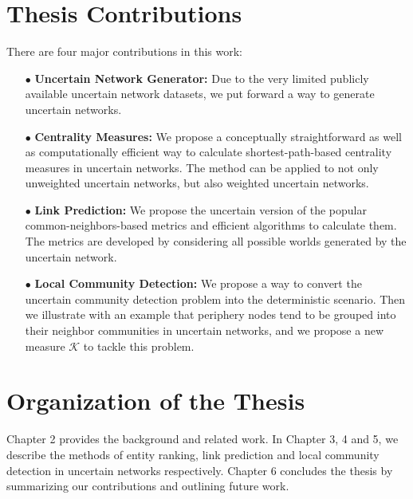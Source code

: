 \documentclass[\main/thesis.tex]{subfiles}
\begin{document}
\section{Thesis Contributions}
There are four major contributions in this work:
\begin{enumerate}
\item[$\bullet$] \textbf{Uncertain Network Generator:}  Due to the very limited publicly available uncertain network datasets, we put forward a way to generate uncertain networks.
\item[$\bullet$] \textbf{Centrality Measures:}  We propose a conceptually straightforward as well as computationally efficient way to calculate shortest-path-based centrality measures in uncertain networks. The method can be applied to not only unweighted uncertain networks, but also weighted uncertain networks.
\item[$\bullet$] \textbf{Link Prediction:}  We propose the uncertain version of the popular common-neighbors-based metrics and efficient algorithms to calculate them. The metrics are developed by considering all possible worlds generated by the uncertain network.
\item[$\bullet$] \textbf{Local Community Detection:} We propose a way to convert the uncertain community detection problem into the deterministic scenario. Then we illustrate with an example that periphery nodes tend to be grouped into their neighbor communities in uncertain networks, and we propose a new measure $\mathcal{K}$ to tackle this problem.

\end{enumerate}

\section{Organization of the Thesis}

Chapter 2 provides the background and related work. In Chapter 3, 4 and 5, we describe the methods of entity ranking, link prediction and local community detection in uncertain networks respectively. Chapter 6 concludes the thesis by summarizing our contributions and outlining future work.

\end{document}
